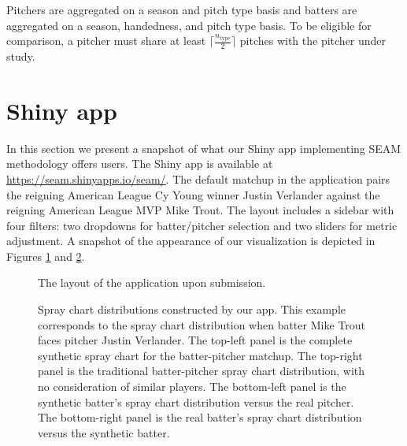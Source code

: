 \documentclass[12pt]{article}
\begin{document}
Pitchers are aggregated on a season and pitch type basis and batters are aggregated on a season, handedness, and pitch type basis. To be eligible for comparison, a pitcher must share at least  $\lceil \frac{n_{\text{type}}}{2} \rceil$ pitches with the pitcher under study. 

 


\section{Shiny app}

In this section we present a snapshot of what our Shiny app implementing SEAM methodology offers users. The Shiny app is available at \url{https://seam.shinyapps.io/seam/}. The default matchup in the application pairs the reigning American League Cy Young winner Justin Verlander against the reigning American League MVP Mike Trout. The layout includes a sidebar with four filters: two dropdowns for batter/pitcher selection and two sliders for metric adjustment. A snapshot of the appearance of our visualization is depicted in Figures \ref{layout} and \ref{spraydists}.


\begin{figure}
\centering
{}
    \caption{The layout of the application upon submission.}
    \label{layout}
\end{figure}

\begin{figure}
\centering
{}
    \caption{Spray chart distributions constructed by our app.  This example 
    corresponds to the spray chart distribution when batter Mike Trout faces 
    pitcher Justin Verlander.
    The top-left panel is the complete synthetic spray chart for 
      the batter-pitcher matchup.
    The top-right panel is the traditional batter-pitcher spray chart 
      distribution, with no consideration of similar players.
    The bottom-left panel is the synthetic batter's spray chart distribution 
      versus the real pitcher. 
    The bottom-right panel is the real batter's spray chart distribution 
      versus the synthetic batter.}
    \label{spraydists}
\end{figure}
\end{document}
